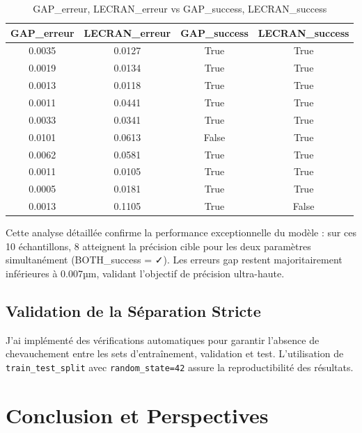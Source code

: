 \documentclass[10pt,twocolumn]{article}
\begin{document}
\begin{table}[!t]
  \centering
  \scriptsize
  \caption{GAP\_erreur, LECRAN\_erreur vs GAP\_success, LECRAN\_success}
  \label{tab:errors_success}
  \begin{tabular}{|c|c|c|c|}
    \hline
    \rowcolor{lightblue}
    \textbf{GAP\_erreur} & \textbf{LECRAN\_erreur} & \textbf{GAP\_success} & \textbf{LECRAN\_success} \\
    \hline
    0.0035 & 0.0127 & True  & True  \\
    0.0019 & 0.0134 & True  & True  \\
    0.0013 & 0.0118 & True  & True  \\
    0.0011 & 0.0441 & True  & True  \\
    0.0033 & 0.0341 & True  & True  \\
    0.0101 & 0.0613 & False & True  \\
    0.0062 & 0.0581 & True  & True  \\
    0.0011 & 0.0105 & True  & True  \\
    0.0005 & 0.0181 & True  & True  \\
    0.0013 & 0.1105 & True  & False \\
    \hline
  \end{tabular}
\end{table}





Cette analyse détaillée confirme la performance exceptionnelle du modèle : sur ces 10 échantillons, 8 atteignent la précision cible pour les deux paramètres simultanément (BOTH\_success = ✓). Les erreurs gap restent majoritairement inférieures à 0.007µm, validant l'objectif de précision ultra-haute.

\subsection{Validation de la Séparation Stricte}

J'ai implémenté des vérifications automatiques pour garantir l'absence de chevauchement entre les sets d'entraînement, validation et test. L'utilisation de \texttt{train\_test\_split} avec \texttt{random\_state=42} assure la reproductibilité des résultats.

\section{Conclusion et Perspectives}
\end{document}
